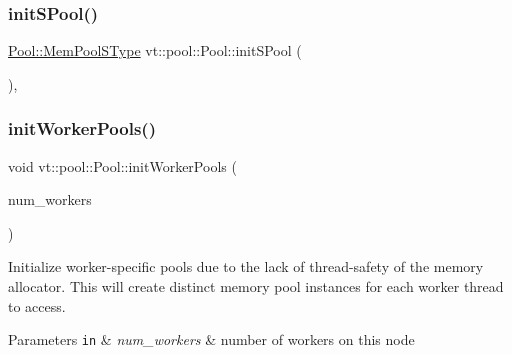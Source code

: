 \mbox{\label{structvt_1_1pool_1_1_pool_a833da3cd4d410ba607b6e7b000810882}} 
\subsubsection{\texorpdfstring{init\+S\+Pool()}{initSPool()}}
{\footnotesize\ttfamily \hyperlink{structvt_1_1pool_1_1_pool_a9f94985824d12c43357cfe50eaaefd38}{Pool\+::\+Mem\+Pool\+S\+Type} vt\+::pool\+::\+Pool\+::init\+S\+Pool (\begin{DoxyParamCaption}{ }\end{DoxyParamCaption})\hspace{0.3cm}{\ttfamily [static]}, {\ttfamily [private]}}

\mbox{\label{structvt_1_1pool_1_1_pool_aeb8ad6a3ac3cf168dc4f2d2be2714edc}} 
\subsubsection{\texorpdfstring{init\+Worker\+Pools()}{initWorkerPools()}}
{\footnotesize\ttfamily void vt\+::pool\+::\+Pool\+::init\+Worker\+Pools (\begin{DoxyParamCaption}\item[{\hyperlink{namespacevt_aa93398ea48f2cb6c188512250f7cc248}{Worker\+Count\+Type} const \&}]{num\+\_\+workers }\end{DoxyParamCaption})}



Initialize worker-\/specific pools due to the lack of thread-\/safety of the memory allocator. This will create distinct memory pool instances for each worker thread to access. 


\begin{DoxyParams}[1]{Parameters}
\mbox{\tt in}  & {\em num\+\_\+workers} & number of workers on this node \\
\hline
\end{DoxyParams}
\mbox{\label{structvt_1_1pool_1_1_pool_a02fa54fc3cca0d388f25f397dfd997ab}} 
